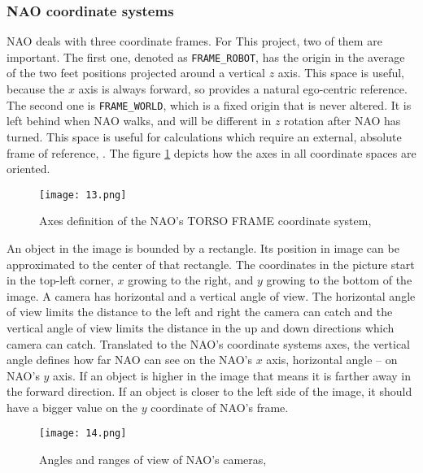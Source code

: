       \subsubsection{NAO coordinate systems}

        NAO deals with three coordinate frames. For This project, two of them are important. The first one, denoted as \verb|FRAME_ROBOT|, has the origin in the average of the two feet positions projected around a vertical \(z\) axis. This space is useful, because the \(x\) axis is always forward, so provides a natural ego-centric reference. The second one is \verb|FRAME_WORLD|, which is a fixed origin that is never altered. It is left behind when NAO walks, and will be different in \(z\) rotation after NAO has turned. This space is useful for calculations which require an external, absolute frame of reference, \cite{naoDocumentation}. The figure \ref{axis} depicts how the axes in all coordinate spaces are oriented. 

        \begin{figure}[ht!]
        \centering
        \texttt{[image: 13.png]} 
        \caption{Axes definition of the NAO's TORSO FRAME coordinate system, \cite{naoDocumentation}}
        \label{axis}
        \end{figure}

      An object in the image is bounded by a rectangle. Its position in image can be approximated to the center of that rectangle. The coordinates in the picture start in the top-left corner, \(x\) growing to the right, and \(y\) growing to the bottom of the image. 
A camera has horizontal and a vertical angle of view. The horizontal angle of view limits the distance to the left and right the camera can catch and the vertical angle of view limits the distance in the up and down directions which camera can catch. Translated to the NAO's coordinate systems axes, the vertical angle defines how far NAO can see on the NAO's \(x\) axis, horizontal angle -- on NAO's \(y\) axis. 
      If an object is higher in the image that means it is farther away in the forward direction. If an object is closer to the left side of the image, it should have a bigger value on the \(y\) coordinate of NAO's frame. 

      \begin{figure}[b!]
        \centering
        \texttt{[image: 14.png]} 
        \caption{Angles and ranges of view of NAO's cameras, \cite{naoDocumentation}}
        \label{angles}
      \end{figure}

